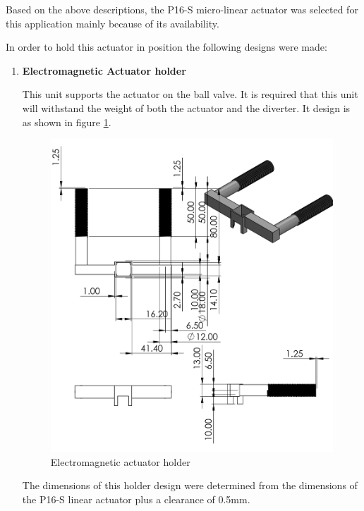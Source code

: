 Based on the above descriptions, the P16-S micro-linear actuator was selected for this application mainly because of its availability.
\par
In order to hold this actuator in position the following designs were made:
\begin{enumerate}
    \item \textbf{Electromagnetic Actuator holder}
    \par
    This unit supports the actuator on the ball valve. It is required that this unit will withstand the weight of both the actuator and the diverter. It design is as shown in figure \ref{fig:electromagnetic_actuator}.
    \begin{figure}[H]
        \centering
        \includegraphics[height=.65\textheight]{Figures/ElectromagnetHolder.PNG}
        \caption{Electromagnetic actuator holder}
        \label{fig:electromagnetic_actuator}
    \end{figure}
    The dimensions of this holder design were determined from the dimensions of the P16-S linear actuator plus a clearance of 0.5mm.
    

\end{enumerate}
